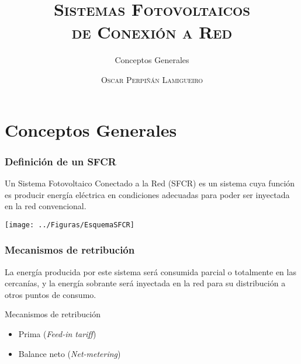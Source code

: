 \documentclass[serif, xcolor=dvipsnames]{beamer}
\begin{document}
\title[\textsc{SFCR: Conceptos Generales}]{\textsc{Sistemas Fotovoltaicos }\\
  \textsc{de Conexión a Red}}


\subtitle{Conceptos Generales}


\author{\textsc{Oscar Perpiñán Lamigueiro}} \date{}

\frame[plain]{\titlepage}


\section{Conceptos Generales}


\begin{frame}
  \frametitle{Definición de un SFCR}

  \begin{block}{}
    Un Sistema Fotovoltaico Conectado a la Red (SFCR) es un sistema
    cuya función es producir energía eléctrica en condiciones
    adecuadas para poder ser inyectada en la red convencional.
  \end{block}

  \begin{center}
    \texttt{[image: ../Figuras/EsquemaSFCR]}
    \par\end{center}
\end{frame}

\begin{frame}
  \frametitle{Mecanismos de retribución}

  \begin{block}{}
    La energía producida por este sistema será consumida parcial o
    totalmente en las cercanías, y la energía sobrante será inyectada
    en la red para su distribución a otros puntos de consumo.
  \end{block}

  \begin{block}{Mecanismos de retribución}
    \begin{itemize}
    \item Prima (\emph{Feed-in tariff})
    \item Balance neto (\emph{Net-metering})
    \end{itemize}
  \end{block}

\end{frame}
\end{document}
